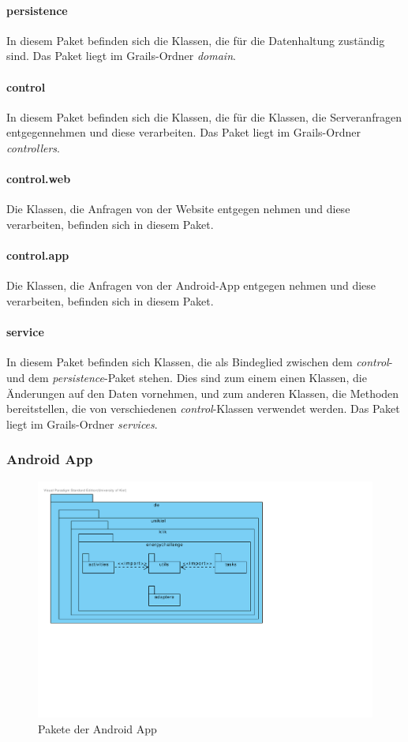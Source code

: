 \paragraph{persistence} In diesem Paket befinden sich die Klassen, die für die Datenhaltung zuständig sind. Das Paket liegt im Grails-Ordner \emph{domain}.
\paragraph{control} In diesem Paket befinden sich die Klassen, die für die Klassen, die Serveranfragen entgegennehmen und diese verarbeiten. Das Paket liegt im Grails-Ordner \emph{controllers}.
\paragraph{control.web} Die Klassen, die Anfragen von der Website entgegen nehmen und diese verarbeiten, befinden sich in diesem Paket.
\paragraph{control.app} Die Klassen, die Anfragen von der Android-App entgegen nehmen und diese verarbeiten, befinden sich in diesem Paket.
\paragraph{service} In diesem Paket befinden sich Klassen, die als Bindeglied zwischen dem \emph{control}- und dem \emph{persistence}-Paket stehen. Dies sind zum einem einen Klassen, die Änderungen auf den Daten vornehmen, und zum anderen Klassen, die Methoden bereitstellen, die von verschiedenen \emph{control}-Klassen verwendet werden. Das Paket liegt im Grails-Ordner \emph{services}.

\subsubsection{Android App}

\begin{figure}[H]
  \centering
  \includegraphics[width=\textwidth, trim=1cm 7cm 9cm 1cm, clip]{gfx/app_package_diagram}
  \caption{Pakete der Android App}
\end{figure}

